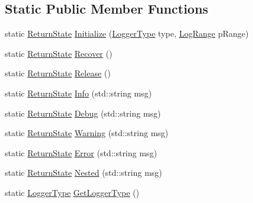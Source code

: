 \subsection*{Static Public Member Functions}
\begin{DoxyCompactItemize}
\item 
static \hyperlink{namespace_osiris_i_a8f53bf938dc75c65c6a529694514013e}{Return\-State} \hyperlink{class_osiris_i_1_1_utilities_1_1_logger_abd3409b1f318628d781c5ab8dbc56f01}{Initialize} (\hyperlink{namespace_osiris_i_1_1_utilities_a77a3086b9443f21343ccbe78d283cbfe}{Logger\-Type} type, \hyperlink{namespace_osiris_i_1_1_utilities_a8a7398a763a2e2e8cc657d8b44b95c20}{Log\-Range} p\-Range)
\item 
static \hyperlink{namespace_osiris_i_a8f53bf938dc75c65c6a529694514013e}{Return\-State} \hyperlink{class_osiris_i_1_1_utilities_1_1_logger_aee94c04cfd4257b7b029d287391cc356}{Recover} ()
\item 
static \hyperlink{namespace_osiris_i_a8f53bf938dc75c65c6a529694514013e}{Return\-State} \hyperlink{class_osiris_i_1_1_utilities_1_1_logger_a395df44d6ad177df3748b5f00d126620}{Release} ()
\item 
static \hyperlink{namespace_osiris_i_a8f53bf938dc75c65c6a529694514013e}{Return\-State} \hyperlink{class_osiris_i_1_1_utilities_1_1_logger_ab7a9f588dde3c396a626176cba7e3727}{Info} (std\-::string msg)
\item 
static \hyperlink{namespace_osiris_i_a8f53bf938dc75c65c6a529694514013e}{Return\-State} \hyperlink{class_osiris_i_1_1_utilities_1_1_logger_ab5ccc52c69d4c2517145a13798919a9d}{Debug} (std\-::string msg)
\item 
static \hyperlink{namespace_osiris_i_a8f53bf938dc75c65c6a529694514013e}{Return\-State} \hyperlink{class_osiris_i_1_1_utilities_1_1_logger_a128f97b666e78dea01d96180ebe5212a}{Warning} (std\-::string msg)
\item 
static \hyperlink{namespace_osiris_i_a8f53bf938dc75c65c6a529694514013e}{Return\-State} \hyperlink{class_osiris_i_1_1_utilities_1_1_logger_aa9b68507dd47b881f690823202e570a1}{Error} (std\-::string msg)
\item 
static \hyperlink{namespace_osiris_i_a8f53bf938dc75c65c6a529694514013e}{Return\-State} \hyperlink{class_osiris_i_1_1_utilities_1_1_logger_a4fc67574ed68e7f81b261d3b0b5a223e}{Nested} (std\-::string msg)
\item 
static \hyperlink{namespace_osiris_i_1_1_utilities_a77a3086b9443f21343ccbe78d283cbfe}{Logger\-Type} \hyperlink{class_osiris_i_1_1_utilities_1_1_logger_a198e26aeecca4cbf94699d7ebb2ed7a9}{Get\-Logger\-Type} ()

\end{DoxyCompactItemize}
